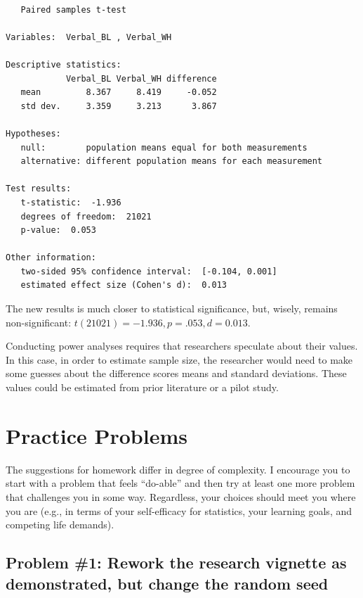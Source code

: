\documentclass[
  11pt,
]{book}
\begin{document}
\begin{verbatim}

   Paired samples t-test 

Variables:  Verbal_BL , Verbal_WH 

Descriptive statistics: 
            Verbal_BL Verbal_WH difference
   mean         8.367     8.419     -0.052
   std dev.     3.359     3.213      3.867

Hypotheses: 
   null:        population means equal for both measurements
   alternative: different population means for each measurement

Test results: 
   t-statistic:  -1.936 
   degrees of freedom:  21021 
   p-value:  0.053 

Other information: 
   two-sided 95% confidence interval:  [-0.104, 0.001] 
   estimated effect size (Cohen's d):  0.013 
\end{verbatim}

The new results is much closer to statistical significance, but, wisely, remains non-significant: \(t(21021) = -1.936, p = .053, d = 0.013\).

Conducting power analyses requires that researchers speculate about their values. In this case, in order to estimate sample size, the researcher would need to make some guesses about the difference scores means and standard deviations. These values could be estimated from prior literature or a pilot study.

\hypertarget{practice-problems-4}{%
\section{Practice Problems}\label{practice-problems-4}}

The suggestions for homework differ in degree of complexity. I encourage you to start with a problem that feels ``do-able'' and then try at least one more problem that challenges you in some way. Regardless, your choices should meet you where you are (e.g., in terms of your self-efficacy for statistics, your learning goals, and competing life demands).

\hypertarget{problem-1-rework-the-research-vignette-as-demonstrated-but-change-the-random-seed-2}{%
\subsection{Problem \#1: Rework the research vignette as demonstrated, but change the random seed}\label{problem-1-rework-the-research-vignette-as-demonstrated-but-change-the-random-seed-2}}
\end{document}
